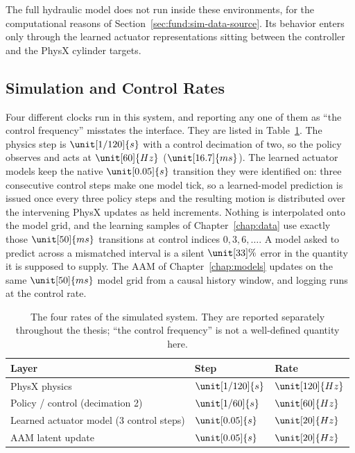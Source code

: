 The full hydraulic model does not run inside these environments, for the
computational reasons of Section~\ref{sec:fund:sim-data-source}. Its
behavior enters only through the learned actuator representations
sitting between the controller and the PhysX cylinder targets.

\subsection{Simulation and Control Rates}
\label{sec:sys:timing}

Four different clocks run in this system, and reporting any one of them
as ``the control frequency'' misstates the interface. They are listed in
Table~\ref{tab:sys:rates}. The physics step is $\unit[1/120]{s}$ with a
control decimation of two, so the policy observes and acts at
$\unit[60]{Hz}$ ($\unit[16.7]{ms}$). The learned actuator models keep
the native $\unit[0.05]{s}$ transition they were identified on: three
consecutive control steps make one model tick, so a learned-model
prediction is issued once every three policy steps and the resulting
motion is distributed over the intervening PhysX updates as held
increments. Nothing is interpolated onto the model grid, and the
learning samples of Chapter~\ref{chap:data} use exactly those
$\unit[50]{ms}$ transitions at control indices $0, 3, 6, \dots$. A
model asked to predict across a mismatched interval is a silent
$\unit[33]{\%}$ error in the quantity it is supposed to supply. The AAM
of Chapter~\ref{chap:models} updates on the same $\unit[50]{ms}$ model
grid from a causal history window, and logging runs at the control rate.

\begin{table}[tb]
  \centering
  \caption{The four rates of the simulated system. They are reported
  separately throughout the thesis; ``the control frequency'' is not a
  well-defined quantity here.}
  \label{tab:sys:rates}
  \small
  \begin{tabular}{lll}
    \toprule
    Layer & Step & Rate \\
    \midrule
    PhysX physics                & $\unit[1/120]{s}$   & $\unit[120]{Hz}$ \\
    Policy / control (decimation 2) & $\unit[1/60]{s}$ & $\unit[60]{Hz}$ \\
    Learned actuator model (3 control steps) & $\unit[0.05]{s}$ & $\unit[20]{Hz}$ \\
    AAM latent update            & $\unit[0.05]{s}$    & $\unit[20]{Hz}$ \\
    \bottomrule
  \end{tabular}
\end{table}

